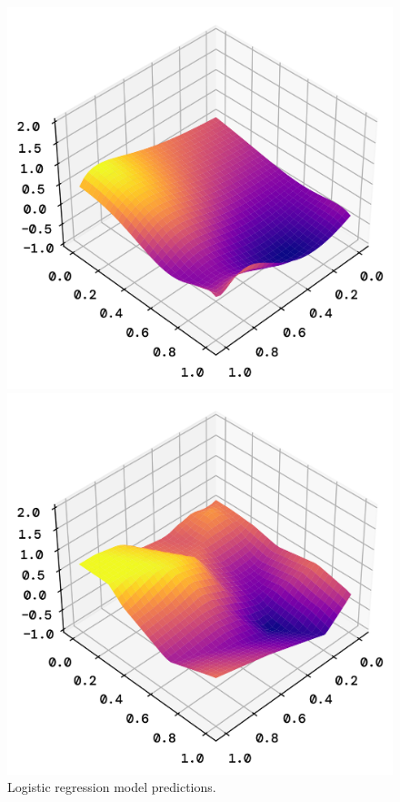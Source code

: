 \documentclass[twoside,11pt]{report}
\begin{document}
    \begin{figure}[!ht]
        \begin{minipage}[t]{0.5\textwidth - 1mm}
            \begin{center}
                \includegraphics[width=\textwidth]{../runsAndFigures/perlinNoise_logistic_pred.png}
            \end{center}
            \caption
            {
                Logistic regression model predictions.
            }\label{fig:perlinNoise_logistic_pred}
        \end{minipage}
        \hspace{2mm}
        \begin{minipage}[t]{0.5\textwidth - 1mm}
            \begin{center}
                \includegraphics[width=\textwidth]{../runsAndFigures/perlinNoise_NN_pred.png}

\end{center}
\end{minipage}
\end{figure}
\end{document}
